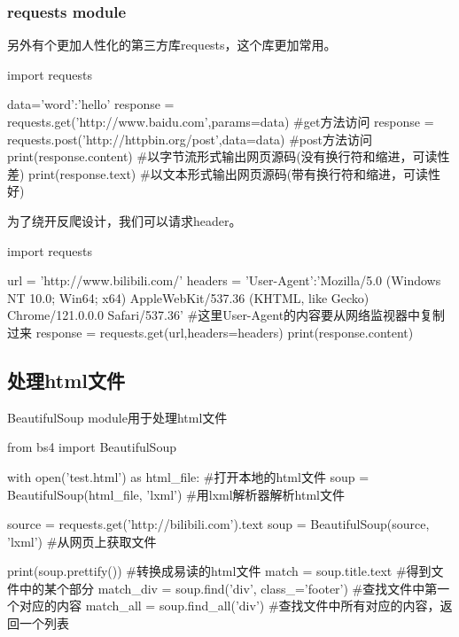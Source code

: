 \documentclass{article}
\begin{document}
      \subsubsection{requests module}
        另外有个更加人性化的第三方库requests，这个库更加常用。
        \begin{codeblock}[language=python, caption={requests module}]
          import requests

          data={'word':'hello'}
          response = requests.get('http://www.baidu.com',params=data) #get方法访问
          response = requests.post('http://httpbin.org/post',data=data) #post方法访问
          print(response.content) #以字节流形式输出网页源码(没有换行符和缩进，可读性差)
          print(response.text) #以文本形式输出网页源码(带有换行符和缩进，可读性好)
        \end{codeblock}

        为了绕开反爬设计，我们可以请求header。
        \begin{codeblock}[language=python, caption={Handling request headers}]
          import requests

          url = 'http://www.bilibili.com/'
          headers = {'User-Agent':'Mozilla/5.0 (Windows NT 10.0; Win64; x64) AppleWebKit/537.36 
              (KHTML, like Gecko) Chrome/121.0.0.0 Safari/537.36'}
          #这里User-Agent的内容要从网络监视器中复制过来
          response = requests.get(url,headers=headers)
          print(response.content)
        \end{codeblock}

    \subsection{处理html文件}
      BeautifulSoup module用于处理html文件
      \begin{codeblock}[language=python, caption={Handling HTML}]
        from bs4 import BeautifulSoup

        with open('test.html') as html_file: #打开本地的html文件
            soup = BeautifulSoup(html_file, 'lxml') #用lxml解析器解析html文件

        source = requests.get('http://bilibili.com').text
        soup = BeautifulSoup(source, 'lxml') #从网页上获取文件

        print(soup.prettify()) #转换成易读的html文件
        match = soup.title.text #得到文件中的某个部分
        match_div = soup.find('div', class_='footer') #查找文件中第一个对应的内容
        match_all = soup.find_all('div') #查找文件中所有对应的内容，返回一个列表
      \end{codeblock}
\end{document}
